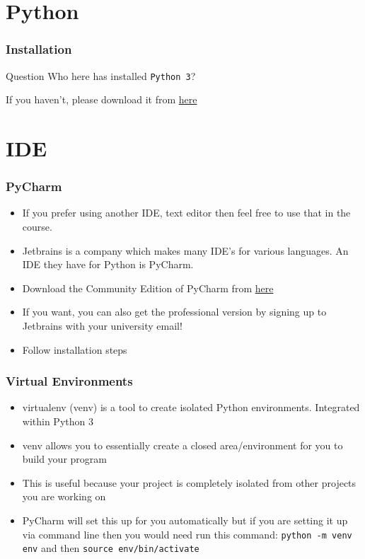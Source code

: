 \documentclass{beamer}
\begin{document}
\section{Python}
\begin{frame}
  \frametitle{Installation}
  \begin{block}{Question}
  	Who here has installed \texttt{Python 3}?    
  \end{block}
  \pause
  If you haven't, please download it from \href{https://www.python.org/downloads/}{here} 
\end{frame}
\section{IDE}
\begin{frame}
  \frametitle{PyCharm}
  \begin{itemize}
  	\item If you prefer using another IDE, text editor then feel free to use that in the course.
  	\item Jetbrains is a company which makes many IDE's for various languages. An IDE they have for Python is PyCharm.
    \item Download the Community Edition of PyCharm from \href{https://www.jetbrains.com/pycharm/}{here}
    \item If you want, you can also get the professional version by signing up to Jetbrains with your university email!
    \item Follow installation steps
   \end{itemize}
\end{frame}
\begin{frame}
  \frametitle{Virtual Environments}
  \begin{itemize}
  	\item virtualenv (venv) is a tool to create isolated Python environments. Integrated within Python 3
  	\item venv allows you to essentially create a closed area/environment for you to build your program
  	\item This is useful because your project is completely isolated from other projects you are working on
  	\item PyCharm will set this up for you automatically but if you are setting it up via command line then you would need run this command: \texttt{python -m venv env} and then \texttt{source env/bin/activate}
   \end{itemize}
\end{frame}
\end{document}
